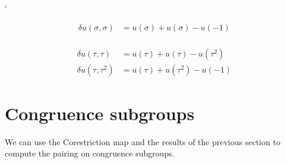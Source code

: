 `\documentclass[12pt]{article}
\theoremstyle{definition}
\def\Z{{\Bbb Z}}
\def\Q{{\Bbb Q}}
\def\Hom{\text{Hom}}
\def\CoInd{\operatorname{CoInd}}
\begin{document}
\begin{align*}
\delta u(\sigma,\sigma) &=u(\sigma)+ u(\sigma)-u(-1)\\
\end{align*}

\begin{align*}
\delta u (\tau,\tau) & = u(\tau) + u(\tau) - u(\tau^2)\\
\delta u(\tau,\tau^2) & = u(\tau)+u(\tau^2)- u(-1)
\end{align*}


\section{Congruence subgroups}
We can use the Corestriction map and the results of the previous section to compute the pairing on congruence subgroups.
%
%
%
%
%
%
\end{document}
